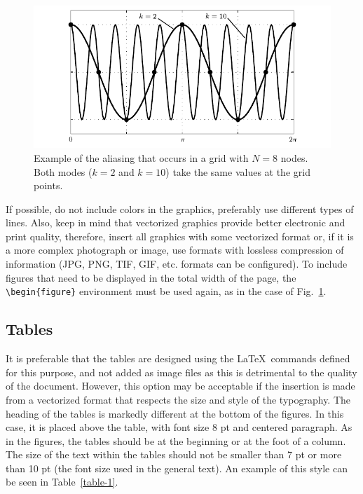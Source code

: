 \documentclass[eng]{ajceam-class}
\begin{document}
\begin{figure}[!tb] 
 \centering
 \includegraphics{figura2.pdf} 
 \caption{Example of the aliasing that occurs in a grid with $N = 8$ nodes. Both modes ($k = 2$ and $k = 10$) take the same values at the grid points.} \label{fig-2}
\end{figure}

If possible, do not include colors in the graphics, preferably use different types of lines. Also, keep in mind that vectorized graphics provide better electronic and print quality, therefore, insert all graphics with some vectorized format or, if it is a more complex photograph or image, use formats with lossless compression of information (JPG, PNG, TIF, GIF, etc. formats can be configured). To include figures that need to be displayed in the total width of the page, the \verb!\begin{figure}! environment must be used again, as in the case of Fig.~\ref{fig-2}.

\subsection{Tables}

It is preferable that the tables are designed using the \LaTeX\ commands defined for this purpose, and not added as image files as this is detrimental to the quality of the document. However, this option may be acceptable if the insertion is made from a vectorized format that respects the size and style of the typography. The heading of the tables is markedly different at the bottom of the figures. In this case, it is placed above the table, with font size 8 pt and centered paragraph. As in the figures, the tables should be at the beginning or at the foot of a column. The size of the text within the tables should not be smaller than 7 pt or more than 10 pt (the font size used in the general text). An example of this style can be seen in Table~\ref{table-1}.
\end{document}
